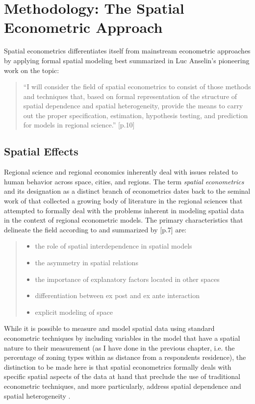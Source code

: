 \section{Methodology:  The Spatial Econometric Approach}
Spatial econometrics differentiates itself from mainstream econometric approaches  by applying formal spatial modeling best summarized in Luc Anselin's pioneering work on the topic:%
\begin{quotation}
	``I will consider the field of spatial econometrics to consist of those methods and techniques that, based on formal representation of the structure of spatial dependence and spatial heterogeneity, provide the means to carry out the proper specification, estimation, hypothesis testing, and prediction for models in regional science.'' \citep{Anselin1988}[p.10]
\end{quotation}	

\subsection{Spatial Effects}
Regional science and regional economics inherently deal with issues related to human behavior across space, cities, and regions.  The term \textit{spatial econometrics} and its designation as a distinct branch of econometrics dates back to the seminal work of \cite{paelinck1979} that collected a growing body of literature in the regional sciences that attempted to formally deal with the problems inherent in modeling spatial data in the context of regional econometric models.  The primary characteristics that delineate the field according to \cite{paelinck1979} and summarized by \cite{Anselin1988}[p.7] are:
\begin{quotation}
\begin{itemize}
 \item the role of spatial interdependence in spatial models
 \item the asymmetry in spatial relations
 \item the importance of explanatory factors located in other spaces
 \item differentiation between ex post and ex ante interaction
 \item explicit modeling of space
\end{itemize}
\end{quotation}

While it is possible to measure and model spatial data using standard econometric techniques  by including variables in the model that have a spatial nature to their measurement (as I have done in the previous chapter, i.e.  the percentage of zoning types within as distance from a respondents residence), the distinction to be made here is that spatial econometrics formally deals with specific spatial aspects of the data at hand that preclude the use of traditional econometric techniques, and more particularly, address spatial dependence and spatial heterogeneity \citep{Anselin1988, LeSage2009}.  

